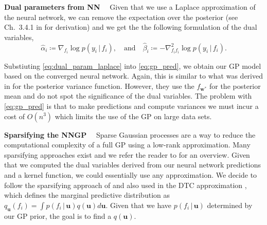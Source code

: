 \documentclass{article}
\renewcommand{\paragraph}[1]{{\bf #1}~~}
\newcommand{\mbf}[1]{\mathbf{#1}}
\renewcommand{\mid}{\,|\,}
\newcommand{\vu}{\mbf{u}}
\newcommand{\vw}{\mbf{w}}
\begin{document}
\paragraph{Dual parameters from NN}
Given that we use a Laplace approximation of the neural network, we can remove the expectation over the posterior (see Ch.~3.4.1 in \cite{rasmussen2006gaussian} for derivation) and we get the the following formulation of the dual variables,
\begin{equation}
\label{eq:dual_param_laplace}
\hat{\alpha}_i \coloneqq \nabla_{f_i}\log p(y_i \mid f_i),  \quad \text{and} \quad
\hat{\beta}_i \coloneqq - \nabla^2_{f_i f_i}\log p(y_i \mid f_i).
\end{equation}

Substiuting \cref{eq:dual_param_laplace} into \cref{eq:gp_pred}, we obtain our GP model based on the converged neural network. Again, this is similar to what was derived in \citet{immer2021improving} for the posterior variance function. However, they use the $f_{\vw^*}$ for the posterior mean and do not spot the significance of the dual variables. The problem with \cref{eq:gp_pred} is that to make predictions and compute variances we must incur a cost of $O(n^3)$ which limits the use of the GP on large data sets.

\paragraph{Sparsifying the NNGP}
\label{sec:sparse-dual-gp}
%
Sparse Gaussian processes are a way to reduce the computational complexity of a full GP using a low-rank approximation. Many sparsifying approaches exist and we refer the reader to \cite{quinonero2005unifying} for an overview. Given that we computed the dual variables derived from our neural network predictions and a kernel function, we could essentially use any approximation. We decide to follow the sparsifying approach of \citet{titsias2009variational} and also used in the DTC approximation \citep{quinonero2005unifying}, which defines the marginal predictive distribution as $q_{\vu}(f_i)  = \int p(f_i  \mid \vu) q(\vu)  d\vu$. Given that we have $p(f_i  \mid \vu)$ determined by our GP prior, the goal is to find a $q(\vu)$. 
\end{document}
